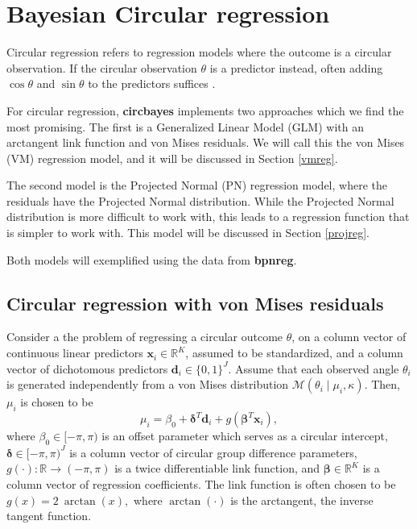 \documentclass{article}
\newcommand{\code}[1]{\texttt{\detokenize{#1}}}
\newcommand{\pkg}[1]{\textbf{#1}}
\begin{document}
\hypertarget{bayesian-circular-regression}{%
	\section{Bayesian Circular
		regression}\label{bayesian-circular-regression}}

\label{circreg}

Circular regression refers to regression models where the outcome is a
circular observation. If the circular observation \(\theta\) is a
predictor instead, often adding \(\cos\theta\) and \(\sin\theta\) to the
predictors suffices \citep{fisher1995statistical}.

For circular regression, \pkg{circbayes} implements two approaches which
we find the most promising. The first is a Generalized Linear Model
(GLM) with an arctangent link function and von Mises residuals. We will
call this the von Mises (VM) regression model, and it will be discussed
in Section \ref{vmreg}.

The second model is the Projected Normal (PN) regression model, where
the residuals have the Projected Normal distribution. While the
Projected Normal distribution is more difficult to work with, this leads
to a regression function that is simpler to work with. This model will
be discussed in Section \ref{projreg}.

Both models will exemplified using the \code{Motor} data
\citep{puglisi2017role} from \pkg{bpnreg}.

\hypertarget{circular-regression-with-von-mises-residuals}{%
	\subsection{Circular regression with von Mises
		residuals}\label{circular-regression-with-von-mises-residuals}}

\label{vmreg}

Consider a the problem of regressing a circular outcome \(\theta\), on a
column vector of continuous linear predictors
\(\boldsymbol{x}_i \in \mathbb{R}^K\), assumed to be standardized, and a
column vector of dichotomous predictors
\(\boldsymbol{d}_i \in \{0, 1\}^J\). Assume that each observed angle
\(\theta_i\) is generated independently from a von Mises distribution
\(\mathcal{M}(\theta_i \mid \mu_i, \kappa)\). Then, \(\mu_i\) is chosen
to be \begin{equation}
\mu_i = \beta_0 + \boldsymbol{\delta}^T \boldsymbol{d}_i + g(\boldsymbol{\beta}^T \boldsymbol{x}_i),
\end{equation} where \(\beta_0 \in [-\pi, \pi)\) is an offset parameter
which serves as a circular intercept,
\(\boldsymbol{\delta}\in [-\pi, \pi)^J\) is a column vector of circular
group difference parameters,
\(g(\cdot) : \mathbb{R} \rightarrow (-\pi, \pi)\) is a twice
differentiable link function, and \(\boldsymbol{\beta}\in \mathbb{R}^K\)
is a column vector of regression coefficients. The link function is
often chosen to be \(g(x) = 2 ~ \arctan(x),\) where \(\arctan(\cdot)\)
is the arctangent, the inverse tangent function.
\end{document}

